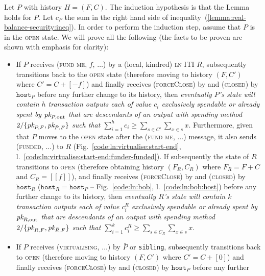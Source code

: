   Let $P$ with history $H = (F, C)$. The induction hypothesis is that the Lemma
  holds for $P$. Let $c_P$ the sum in the right hand side of
  inequality~(\ref{lemma:real-balance-security:ineq}). In order to perform the
  induction step, assume that $P$ is in the \textsc{open} state. We will prove
  all the following (the facts to be proven are shown with emphasis for
  clarity):
  \begin{itemize}
    \item If $P$ receives (\textsc{fund me}, $f$, $\dots$) by a (local, kindred)
    \textsc{ln} ITI $R$, subsequently transitions back to the \textsc{open}
    state (therefore moving to history $(F, C')$ where $C' = C + [-f]$) and
    finally receives (\textsc{forceClose}) by \environment and (\textsc{closed}) by
    $\texttt{host}_P$ before any further change to its history, then
    \emph{eventually $P$'s \ledger state will contain $h$ transaction outputs
    each of value $c_i$ exclusively spendable or already spent by $\textit{pk}_{P,
    \mathrm{out}}$ that are descendants of an output with spending method
    $2/\{\textit{pk}_{P, F}, \textit{pk}_{\bar{P}, F}\}$ such that $\sum\limits_{i=1}^h c_i \geq
    \sum\limits_{s \in C'} \sum\limits_{x \in s} x$}. Furthermore, given that
    $P$ moves to the \textsc{open} state after the (\textsc{fund me}, $\dots$)
    message, it also sends (\textsc{funded}, $\dots$) to $R$
    (Fig.~\ref{code:ln:virtualise:start-end},
    l.~\ref{code:ln:virtualise:start-end:funder-funded}). If subsequently the
    state of $R$ transitions to \textsc{open} (therefore obtaining history
    $(F_R, C_R)$ where $F_R = F + C$ and $C_R = [[f]]$), and finally receives
    (\textsc{forceClose}) by \environment and (\textsc{closed}) by $\texttt{host}_R$
    ($\texttt{host}_R = \texttt{host}_P$ -- Fig.~\ref{code:ln:bob},
    l.~\ref{code:ln:bob:host}) before any further change to its history, then
    \emph{eventually $R$'s \ledger state will contain $k$ transaction outputs
    each of value $c^R_i$ exclusively spendable or already spent by $\textit{pk}_{R,
    \mathrm{out}}$ that are descendants of an output with spending method
    $2/\{\textit{pk}_{R, F}, \textit{pk}_{\bar{R}, F}\}$ such that $\sum\limits_{i=1}^k c^R_i \geq
    \sum\limits_{s \in C_R} \sum\limits_{x \in s} x$}.
    \item If $P$ receives (\textsc{virtualising}, $\dots$) by $\bar{P}$ or
    \texttt{sibling},
    subsequently transitions back to \textsc{open} (therefore moving to history
    $(F, C')$ where $C' = C + [0]$) and finally receives (\textsc{forceClose}) by
    \environment and (\textsc{closed}) by $\texttt{host}_P$ before any further

\end{itemize}
